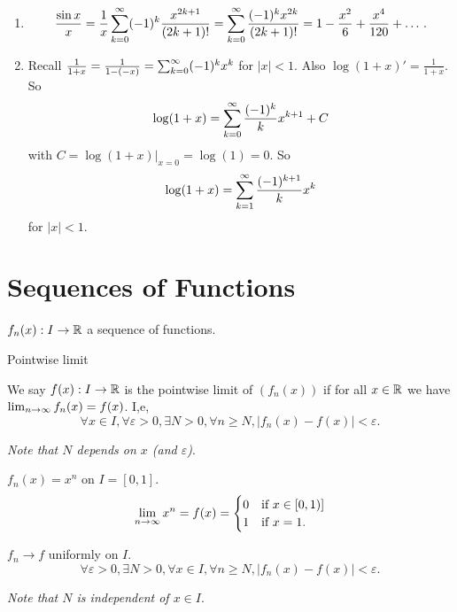 \documentclass[10pt, a4paper]{article}
\begin{document}
\begin{example}
\begin{solution}
\begin{enumerate}[label = (\roman*)]
            \item
            \[
            \frac{\sin{x}}{x} = \frac{1}{x}\sum_{k = 0}^{\infty}(-1) ^ k\frac{x ^ {2k + 1}}{(2k + 1)!} = \sum_{k = 0}^{\infty}\frac{(-1) ^ kx ^ {2k}}{(2k + 1)!} = 1 - \frac{x ^ 2}{6} + \frac{x ^ 4}{120} + \dotsc.
            \]

            \item
            Recall $\frac{1}{1 + x} = \frac{1}{1 - (-x)} = \sum_{k = 0}^{\infty} (-1) ^ kx ^ k$ for $|x| < 1$.
            Also $\log(1 + x)' = \frac{1}{1 + x}$.
            So
            \[
            \log(1 + x) = \sum_{k = 0}^{\infty}\frac{(-1) ^ k}{k}x ^ {k + 1} + C
            \]
            with $C = \log(1 + x)|_{x = 0} = \log(1) = 0$.
            So
            \[
            \log(1 + x) = \sum_{k = 1}^{\infty}\frac{(-1) ^ {k + 1}}{k}x ^ k
            \]
            for $|x| < 1$.
        \end{enumerate}
    \end{solution}
\end{example}

\newpage

\section{Sequences of Functions}
$f_n(x) : I \to \mathbb{R}$ a sequence of functions.

Pointwise limit

\begin{definition}
    We say $f(x) : I \to \mathbb{R}$ is the pointwise limit of $(f_n(x))$ if for all $x \in \mathbb{R}$ we have $\lim_{n \rightarrow \infty} f_n(x) = f(x)$.
    I,e,
    \[
    \forall x \in I, \forall \varepsilon > 0, \exists N > 0, \forall n \geq N, |f_n(x) - f(x)| < \varepsilon.
    \]
\end{definition}
\textit{Note that $N$ depends on $x$
(and $\varepsilon$)}.

\begin{example}
    $f_n(x) = x ^ n$ on $I = [0, 1]$.
    \[
    \lim_{n \rightarrow \infty} x ^ n = f(x)  = \begin{cases}
        0 & \text{if } x \in [0, 1)] \\
        1 & \text{if } x = 1.
    \end{cases}
    \]
\end{example}

\begin{definition}
    $f_n \to f$ uniformly on $I$.
    \[
    \forall \varepsilon > 0, \exists N > 0, \forall x \in I, \forall n \geq N, |f_n(x) - f(x)| < \varepsilon.
    \]
\end{definition}
\textit{Note that $N$ is independent of $x \in I$}.
\end{document}
